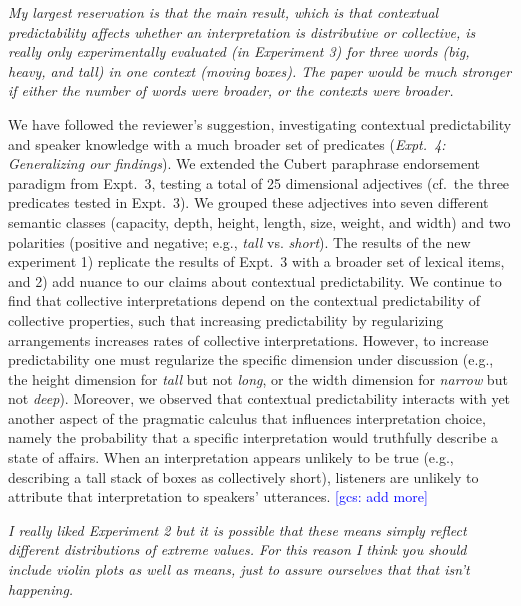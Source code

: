 \documentclass[12pt]{article}
\newcommand{\gcs}[1]{\textcolor{blue}{[gcs: #1]}}
\begin{document}
\item \emph{My largest reservation is that the main result, which is that contextual predictability affects whether an interpretation is distributive or collective, is really only experimentally evaluated (in Experiment 3) for three words (\emph{big}, \emph{heavy}, and \emph{tall}) in one context (moving boxes). The paper would be much stronger if either the number of words were broader, or the contexts were broader.}

We have followed the reviewer's suggestion, investigating contextual predictability and speaker knowledge with a much broader set of predicates (\emph{Expt.~4: Generalizing our findings}). We extended the Cubert paraphrase endorsement paradigm from Expt.~3, testing a total of 25 dimensional adjectives (cf.~the three predicates tested in Expt.~3). We grouped these adjectives into seven different semantic classes (capacity, depth, height, length, size, weight, and width) and two polarities (positive and negative; e.g., \emph{tall} vs. \emph{short}). The results of the new experiment 1) replicate the results of Expt.~3 with a broader set of lexical items, and 2) add nuance to our claims about contextual predictability. We continue to find that collective interpretations depend on the contextual predictability of collective properties, such that increasing predictability by regularizing arrangements increases rates of collective interpretations. However, to increase predictability one must regularize the specific dimension under discussion (e.g., the height dimension for \emph{tall} but not \emph{long}, or the width dimension for \emph{narrow} but not \emph{deep}). Moreover, we observed that contextual predictability interacts with yet another aspect of the pragmatic calculus that influences interpretation choice, namely the probability that a specific interpretation would truthfully describe a state of affairs. When an interpretation appears unlikely to be true (e.g., describing a tall stack of boxes as collectively short), listeners are unlikely to attribute that interpretation to speakers' utterances. \gcs{add more}

\item \emph{I really liked Experiment 2 but it is possible that these means simply reflect different distributions of extreme values. For this reason I think you should include violin plots as well as means, just to assure ourselves that that isn't happening.}
\end{document}
